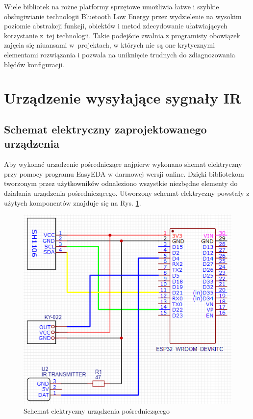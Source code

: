 \documentclass[12pt,twoside]{article}
\begin{document}
Wiele bibliotek na rożne platformy sprzętowe umożliwia łatwe i szybkie obsługiwianie technologii Bluetooth Low Energy przez wydzielenie na wysokim poziomie abstrakcji funkcji, obiektów i metod zdecydowanie ułatwiających korzystanie z~tej technologii. Takie podejście zwalnia z programisty obowiązek zajęcia się niuansami w~projektach, w których nie są one krytycznymi elementami rozwiązania i pozwala na uniknięcie trudnych do zdiagnozowania błędów konfiguracji.

\clearpage

\section{Urządzenie wysyłające sygnały IR}
\subsection{Schemat elektryczny zaprojektowanego urządzenia}
Aby wykonać urzadzenie pośredniczące najpierw wykonano shemat elektryczny przy pomocy programu EasyEDA w darmowej wersji online\cite{easyEda}. Dzięki bibliotekom tworzonym przez użytkowników odnaleziono wszystkie niezbędne elementy do działania urządzenia pośredniczącego. Utworzony schemat elektryczny powstały z użytych komponentów znajduje się na Rys. \ref*{Fig:deviceScheme}.
\begin{figure}[ht]
   \centering
   \includegraphics[width=12cm]{images/deviceScheme.png}
   \caption{Schemat elektryczny urządzenia pośredniczącego}
   \label{Fig:deviceScheme}
\end{figure}
\end{document}
